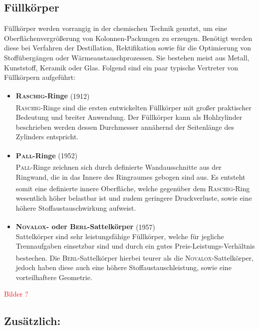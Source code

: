 \newpage

\subsection{Füllkörper}
Füllkörper werden vorrangig in der chemischen Technik genutzt, um eine Oberflächenvergrößerung von Kolonnen-Packungen zu erzeugen. Benötigt werden diese bei Verfahren der Destillation, Rektifikation sowie für die Optimierung von Stoffübergängen oder Wärmeaustauschprozessen. Sie bestehen meist aus Metall, Kunststoff, Keramik oder Glas. Folgend sind ein paar typische Vertreter von Füllkörpern aufgeführt:
\begin{itemize}
	\item \textbf{ \textsc{Raschig}\textsuperscript{\textregistered}-Ringe} (1912)\\
	\textsc{Raschig}\textsuperscript{\textregistered}-Ringe sind die ersten entwickelten Füllkörper mit großer praktischer Bedeutung und breiter Anwendung.  Der Füllkörper kann als Hohlzylinder beschrieben werden dessen Durchmesser annähernd der Seitenlänge des Zylinders entspricht.
	\item \textbf{\textsc{Pall}\textsuperscript{\textregistered}-Ringe} (1952)\\
	\textsc{Pall}\textsuperscript{\textregistered}-Ringe zeichnen sich durch definierte Wandausschnitte aus der Ringwand, die in das Innere des Ringraumes gebogen sind aus. Es entsteht somit eine definierte innere Oberfläche, welche gegenüber dem 	\textsc{Raschig}\textsuperscript{\textregistered}-Ring wesentlich höher belastbar ist und zudem geringere Druckverluste, sowie eine höhere Stoffaustauschwirkung aufweist.
	\item \textbf{\textsc{Novalox}\textsuperscript{\textregistered}- oder \textsc{Berl}\textsuperscript{\textregistered}-Sattelkörper} (1957)\\
		Sattelkörper sind sehr leistungsfähige Füllkörper, welche für jegliche Trennaufgaben einsetzbar sind und durch ein gutes Preis-Leistungs-Verhältnis bestechen. Die \textsc{Berl}\textsuperscript{\textregistered}-Sattelkörper hierbei teurer als die \textsc{Novalox}\textsuperscript{\textregistered}-Sattelkörper, jedoch haben diese auch eine höhere Stoffaustauschleistung, sowie eine vorteilhaftere Geometrie.
\end{itemize}

\textcolor{red}{Bilder ?}

\newpage

\subsection{Zusätzlich:}
